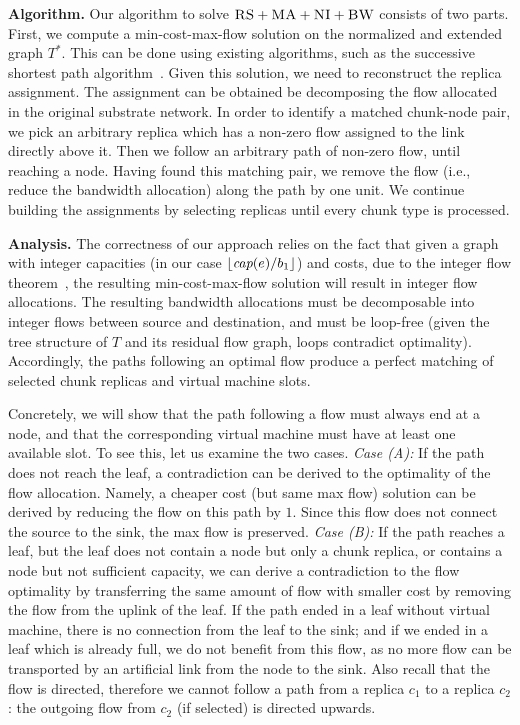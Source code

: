 \documentclass[9pt]{sigcomm-alternate}
\newcommand{\achunk}{\ensuremath{c}}
\newcommand{\capacity}{\emph{cap}}
\newcommand{\CC}{\textsc{NI}}
\newcommand{\RS}{\textsc{RS}}
\newcommand{\BW}{\textsc{BW}}
\newcommand{\MA}{\textsc{MA}}
\newcommand{\Tree}{\ensuremath{T}}
\newcommand{\CostTrans}{\ensuremath{b_1}}
\begin{document}
\textbf{Algorithm.}
Our algorithm to solve $\RS+\MA+\CC+\BW$ consists of two parts. 
First, we compute a min-cost-max-flow solution on the normalized and extended graph $\Tree^*$. 
This can be done using existing algorithms, such as the successive shortest path algorithm~\cite{successive_shortest_path_complexity}.
Given this solution, we need to reconstruct the replica assignment. 
The assignment can be obtained be decomposing the flow allocated in the
original substrate network. In order to identify a matched chunk-node pair, we 
pick an arbitrary replica which has a non-zero flow assigned to the link directly above it. 
Then we follow an arbitrary path of non-zero flow, until reaching a node.
Having found this matching pair, we remove the flow (i.e., reduce the bandwidth allocation)
along the path by one unit. 
We continue building the assignments by selecting replicas until every chunk type is processed.

\textbf{Analysis.}
The correctness of our approach relies on the fact that
given a graph with integer capacities (in our case $\lfloor\capacity(e)/\CostTrans\rfloor$)
and costs, due to the integer flow theorem~\cite{successive_shortest_path_complexity},
the resulting min-cost-max-flow solution will result in integer flow allocations. The resulting
bandwidth allocations must be decomposable into integer flows between source and destination,
and must be loop-free (given the tree structure of $\Tree$ and its residual flow graph, loops contradict optimality). 
Accordingly, the paths following an optimal flow produce a perfect matching of selected chunk replicas and virtual machine slots.

Concretely, we will show that the path following a flow must always end at a node, and that the
corresponding virtual machine must have at least one available slot.
To see this, let us examine the two cases.
\emph{Case (A):} If the path does not reach the leaf, a contradiction can be derived to the optimality of
the flow allocation. Namely, a cheaper cost (but same max flow) solution can be derived by reducing the flow on this path by $1$.
Since this flow does not connect the source to the sink, the max flow is preserved. 
\emph{Case (B):} If the 
path reaches a leaf, but the leaf does not contain a node but only a chunk replica, or
 contains a node but not sufficient capacity, 
 we can derive a contradiction to the flow optimality by transferring the same amount of flow with smaller cost by removing 
 the flow from the uplink of the leaf. 
 If the path ended in a leaf without virtual machine, there is no connection from the leaf to the sink; 
 and if we ended in a leaf which is already full, we do not benefit from this flow, 
 as no more flow can be transported by an artificial link from the node to the 
 sink. 
 Also recall that the flow is directed, therefore we cannot follow a path 
 from a replica $\achunk_1$ to a replica $\achunk_2$: the 
 outgoing flow from $\achunk_2$ (if selected) is directed upwards.
\end{document}

